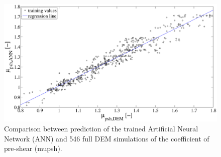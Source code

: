 \begin{figure}[!h] 
\centering 
\includegraphics[width=.80\columnwidth]{images/022regression.eps}
\caption[Comparison between prediction of the trained ANN and full DEM
simulation]{Comparison between prediction of the trained Artificial Neural
Network (\acs{ANN}) and 546 
full DEM simulations of the coefficient of pre-shear
(\acs{mupsh}).}
\label{fig:022regression} 
\end{figure}